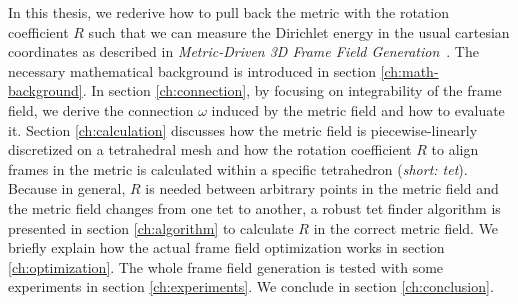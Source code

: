 \documentclass[../thesis.tex]{subfiles}
\begin{document}
In this thesis, we rederive how to pull back the metric with the rotation coefficient $R$ such that we can measure
the Dirichlet energy in the usual cartesian coordinates as described in \emph{Metric-Driven 3D Frame Field Generation}~\cite{Fang23}.
The necessary mathematical background is introduced in section \ref{ch:math-background}.
In section \ref{ch:connection}, by focusing on integrability of the frame field,
we derive the connection $\omega$ induced by the metric field and how to evaluate it.
Section \ref{ch:calculation} discusses how the metric field is piecewise-linearly discretized on a tetrahedral
mesh and how the rotation coefficient $R$ to align frames in the metric is calculated within a specific tetrahedron (\emph{short: tet}).
Because in general, $R$ is needed between arbitrary points in the metric field and the metric field
changes from one tet to another, a robust tet finder algorithm is
presented in section \ref{ch:algorithm} to calculate $R$ in the correct metric field.
We briefly explain how the actual frame field optimization works in section \ref{ch:optimization}.
The whole frame field generation is tested with some experiments in section \ref{ch:experiments}.
We conclude in section \ref{ch:conclusion}.
\end{document}
